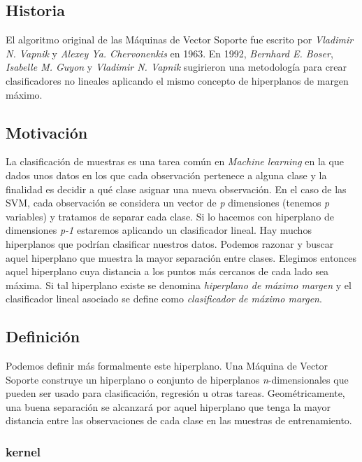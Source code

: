\documentclass[12pt,spanish,a4paper]{article}
\numberwithin{equation}{section}
\begin{document}
\hypertarget{historia}{%
\subsection{Historia}\label{historia}}

El algoritmo original de las Máquinas de Vector Soporte fue escrito por
\emph{Vladimir N. Vapnik} y \emph{Alexey Ya. Chervonenkis} en 1963. En
1992, \emph{Bernhard E. Boser}, \emph{Isabelle M. Guyon} y
\emph{Vladimir N. Vapnik} sugirieron una metodología para crear
clasificadores no lineales aplicando el mismo concepto de hiperplanos de
margen máximo.

\hypertarget{motivacion}{%
\subsection{Motivación}\label{motivacion}}

La clasificación de muestras es una tarea común en \emph{Machine
learning} en la que dados unos datos en los que cada observación
pertenece a alguna clase y la finalidad es decidir a qué clase asignar
una nueva observación. En el caso de las SVM, cada observación se
considera un vector de \emph{p} dimensiones (tenemos \emph{p} variables)
y tratamos de separar cada clase. Si lo hacemos con hiperplano de
dimensiones \emph{p-1} estaremos aplicando un clasificador lineal. Hay
muchos hiperplanos que podrían clasificar nuestros datos. Podemos
razonar y buscar aquel hiperplano que muestra la mayor separación entre
clases. Elegimos entonces aquel hiperplano cuya distancia a los puntos
más cercanos de cada lado sea máxima. Si tal hiperplano existe se
denomina \emph{hiperplano de máximo margen} y el clasificador lineal
asociado se define como \emph{clasificador de máximo margen}.

\hypertarget{definicion}{%
\subsection{Definición}\label{definicion}}

Podemos definir más formalmente este hiperplano. Una Máquina de Vector
Soporte construye un hiperplano o conjunto de hiperplanos
\emph{n}-dimensionales que pueden ser usado para clasificación,
regresión u otras tareas. Geométricamente, una buena separación se
alcanzará por aquel hiperplano que tenga la mayor distancia entre las
observaciones de cada clase en las muestras de entrenamiento.

\hypertarget{kernel}{%
\subsubsection{kernel}\label{kernel}}
\end{document}
